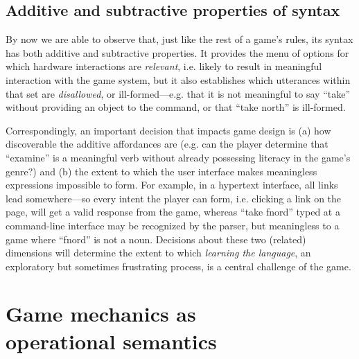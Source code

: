   \subsection*{Additive and subtractive properties of syntax}
  
  By now we are able to observe that, just like the rest of a game's rules,
  its syntax has both additive and subtractive properties. It provides the
  menu of options for which hardware interactions are {\em relevant}, i.e.
  likely to result in meaningful interaction with the game system, but it
  also establishes which utterances within that set are {\em disallowed},
  or ill-formed---e.g. that it is not meaningful to say ``take'' without
  providing an object to the command, or that ``take north'' is ill-formed.

  Correspondingly, an important decision that impacts game design is (a)
  how discoverable the additive affordances are (e.g. can the player
  determine that ``examine'' is a meaningful verb without already
  possessing literacy in the game's genre?) and (b) the extent to which the
  user interface makes meaningless expressions impossible to form. For
  example, in a hypertext interface, all links lead somewhere---so every
  intent the player can form, i.e. clicking a link on the page, will get a
  valid response from the game, whereas ``take fnord'' typed at a
  command-line interface may be recognized by the parser, but meaningless
  to a game where ``fnord'' is not a noun.  Decisions about these two
  (related) dimensions will determine the extent to which {\em learning the
  language}, an exploratory but sometimes frustrating process, is a central
  challenge of the game.
  


  \section{Game mechanics as \\ operational semantics}
  \label{sec:opsem}



